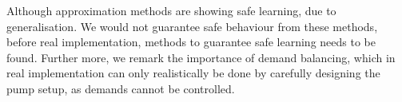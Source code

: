 Although approximation methods are showing safe learning, due to generalisation. We would not guarantee safe behaviour from these methods, before real implementation, methods to guarantee safe learning needs to be found. Further more, we remark the importance of demand balancing, which in real implementation can only realistically be done by carefully designing the pump setup, as demands cannot be controlled. 
